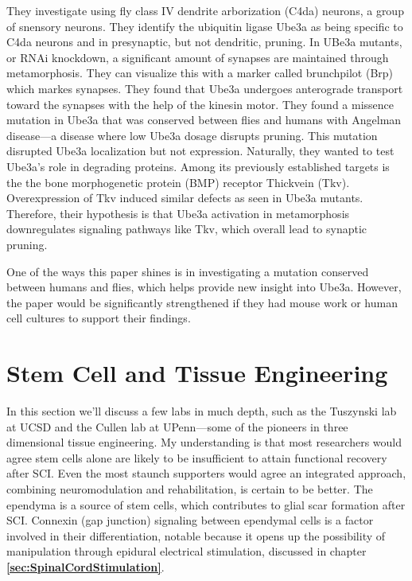 \documentclass[12pt]{report}
\begin{document}
They investigate using fly class IV dendrite arborization (C4da) neurons, a group of snensory neurons. They identify the ubiquitin ligase Ube3a as being specific to C4da neurons and in presynaptic, but not dendritic, pruning. In UBe3a mutants, or RNAi knockdown, a significant amount of synapses are maintained through metamorphosis. They can visualize this with a marker called brunchpilot (Brp) which markes synapses. They found that Ube3a undergoes anterograde transport toward the synapses with the help of the kinesin motor. They found a missence mutation in Ube3a that was conserved between flies and humans with Angelman disease---a disease where low Ube3a dosage disrupts pruning. This mutation disrupted Ube3a localization but not expression. Naturally, they wanted to test Ube3a's role in degrading proteins. Among its previously established targets is the the bone morphogenetic protein (BMP) receptor Thickvein (Tkv). Overexpression of Tkv induced similar defects as seen in Ube3a mutants. Therefore, their hypothesis is that Ube3a activation in metamorphosis downregulates signaling pathways like Tkv, which overall lead to synaptic pruning.\newline

One of the ways this paper shines is in investigating a mutation conserved between humans and flies, which helps provide new insight into Ube3a. However, the paper would be significantly strengthened if they had mouse work or human cell cultures to support their findings. 






\chapter{Stem Cell and Tissue Engineering}

\label{sec:Stem-Cells}

In this section we'll discuss a few labs in much depth, such as the Tuszynski lab at UCSD and the Cullen lab at UPenn---some of the pioneers in three dimensional tissue engineering. My understanding is that most researchers would agree stem cells alone are likely to be insufficient to attain functional recovery after SCI. Even the most staunch supporters would agree an integrated approach, combining neuromodulation and rehabilitation, is certain to be better. The ependyma is a source of stem cells, which contributes to glial scar formation after SCI. Connexin (gap junction) signaling between ependymal cells is a factor involved in their differentiation, notable because it opens up the possibility of manipulation through epidural electrical stimulation, discussed in chapter \textbf{\ref{sec:SpinalCordStimulation}}.\newline
\end{document}

